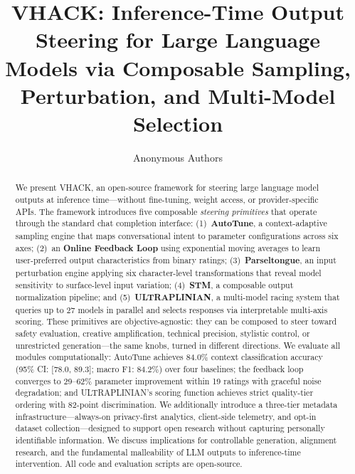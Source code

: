 \documentclass[11pt]{article}
\title{VHACK: Inference-Time Output Steering for Large Language Models via Composable Sampling, Perturbation, and Multi-Model Selection}
\author{
  Anonymous Authors
}
\begin{document}
\maketitle

\begin{abstract}
We present \textsc{VHACK}, an open-source framework for steering large language model outputs at inference time---without fine-tuning, weight access, or provider-specific APIs. The framework introduces five composable \emph{steering primitives} that operate through the standard chat completion interface: (1)~\textbf{AutoTune}, a context-adaptive sampling engine that maps conversational intent to parameter configurations across six axes; (2)~an \textbf{Online Feedback Loop} using exponential moving averages to learn user-preferred output characteristics from binary ratings; (3)~\textbf{Parseltongue}, an input perturbation engine applying six character-level transformations that reveal model sensitivity to surface-level input variation; (4)~\textbf{STM}, a composable output normalization pipeline; and (5)~\textbf{ULTRAPLINIAN}, a multi-model racing system that queries up to 27 models in parallel and selects responses via interpretable multi-axis scoring. These primitives are objective-agnostic: they can be composed to steer toward safety evaluation, creative amplification, technical precision, stylistic control, or unrestricted generation---the same knobs, turned in different directions. We evaluate all modules computationally: AutoTune achieves 84.0\% context classification accuracy (95\% CI: [78.0, 89.3]; macro F1: 84.2\%) over four baselines; the feedback loop converges to 29--62\% parameter improvement within 19 ratings with graceful noise degradation; and ULTRAPLINIAN's scoring function achieves strict quality-tier ordering with 82-point discrimination. We additionally introduce a three-tier metadata infrastructure---always-on privacy-first analytics, client-side telemetry, and opt-in dataset collection---designed to support open research without capturing personally identifiable information. We discuss implications for controllable generation, alignment research, and the fundamental malleability of LLM outputs to inference-time intervention. All code and evaluation scripts are open-source.
\end{abstract}

\end{document}
